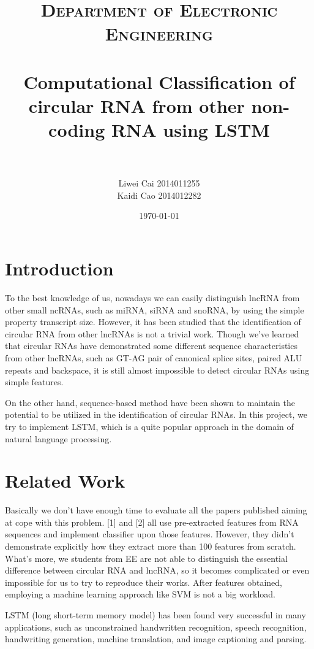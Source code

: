 \documentclass[10pt,a4paper]{article}
\title{	
\normalfont \normalsize
\textsc{Department of Electronic Engineering} \\ [25pt]
\horrule{0.5pt} \\[0.4cm] %
\huge Computational Classification of circular RNA from other non-coding RNA using LSTM\\ %
\horrule{2pt} \\[0.5cm] %
}
\author{ Liwei Cai 2014011255\\
	Kaidi Cao 2014012282 } %
\date{\normalsize\today} %
\begin{document}
	
\begin{spacing}{1.5}
\begin{titlepage}
\maketitle %
\end{titlepage}

\newpage

\section{Introduction}

To the best knowledge of us, nowadays we can easily distinguish lncRNA from other small ncRNAs, such as miRNA, siRNA and snoRNA, by using the simple property transcript size. However, it has been studied that the identification of circular RNA from other lncRNAs is not a trivial work. Though we've learned that circular RNAs have demonstrated some different sequence characteristics from other lncRNAs, such as GT-AG pair of canonical splice sites, paired ALU repeats and backspace, it is still almost impossible to detect circular RNAs using simple features. 

On the other hand, sequence-based method have been shown to maintain the potential to be utilized in the identification of circular RNAs. In this project, we try to implement LSTM, which is a quite popular approach in the domain of natural language processing. 

\section{Related Work}

Basically we don't have enough time to evaluate all the papers published aiming at cope with this problem. [1] and [2] all use pre-extracted features from RNA sequences and implement classifier upon those features. However, they didn't demonstrate explicitly how they extract more than 100 features from scratch. What's more, we students from EE are not able to distinguish the essential difference between circular RNA and lncRNA, so it becomes complicated or even impossible for us to try to reproduce their works. After features obtained, employing a machine learning approach like SVM is not a big workload.

LSTM (long short-term memory model) has been found very successful in many applications, such as unconstrained handwritten recognition, speech recognition, handwriting generation, machine translation, and image captioning and parsing. 


\end{spacing}
\end{document}

